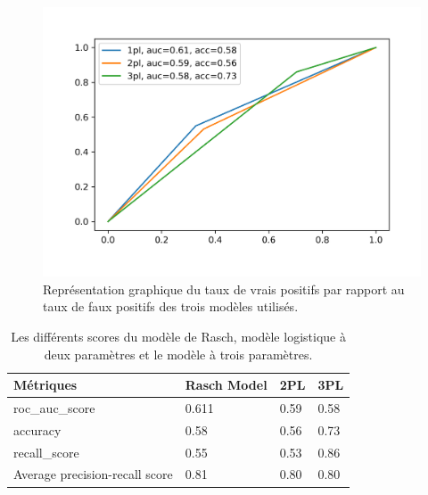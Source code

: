 

\begin{figure}[H]
	\begin{center}
		\includegraphics[scale=0.8]{images/chapitre7/roc_auc.png}
	\end{center}
	\caption{Représentation graphique du taux de vrais positifs par rapport au taux de faux positifs des trois modèles utilisés.}
	\label{roc_auc}
\end{figure}

\begin{table}[H]
	\centering
	\begin{tabular}{|m{3cm}|m{3cm}|m{3cm}|m{3cm}|}
	\hline
	\rowcolor{blueforest}
	\color{white} \textbf{Métriques} & \color{white} \textbf{Rasch Model} & \color{white} \textbf{2PL} & \color{white} \textbf{3PL} \\
	\hline\hline
	roc\_auc\_score & 0.611 & 0.59 & 0.58 \\ \hline
	accuracy & 0.58 & 0.56 & 0.73\\ \hline
	recall\_score & 0.55 & 0.53 & 0.86\\ \hline
	Average precision-recall score & 0.81 & 0.80 & 0.80\\ \hline
	\end{tabular}
	\caption{Les différents scores du modèle de Rasch, modèle logistique à deux paramètres et le modèle à trois paramètres.}
\end{table}

